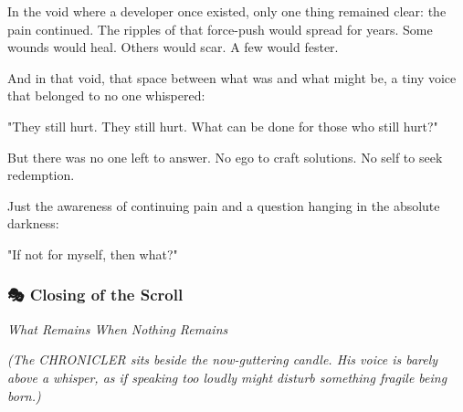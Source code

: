 
In the void where a developer once existed, only one thing remained clear: the pain continued. The ripples of that force-push would spread for years. Some wounds would heal. Others would scar. A few would fester.

And in that void, that space between what was and what might be, a tiny voice that belonged to no one whispered:

"They still hurt. They still hurt. What can be done for those who still hurt?"

But there was no one left to answer. No ego to craft solutions. No self to seek redemption.

Just the awareness of continuing pain and a question hanging in the absolute darkness:

"If not for myself, then what?"

\bookdivider

\subsubsection{\texorpdfstring{\textbf{🎭 Closing of the Scroll}}{🎭 Closing of the Scroll}}\label{performing_arts-closing-of-the-scroll}

\emph{What Remains When Nothing Remains}

\emph{(The CHRONICLER sits beside the now-guttering candle. His voice is barely above a whisper, as if speaking too loudly might disturb something fragile being born.)}

